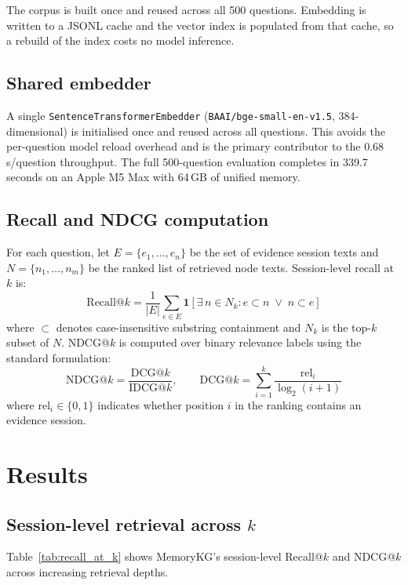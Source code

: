 \documentclass[11pt,a4paper]{article}
\begin{document}
The corpus is built once and reused across all 500 questions.
Embedding is written to a JSONL cache and the vector index is populated from
that cache, so a rebuild of the index costs no model inference.

\subsection{Shared embedder}

A single \texttt{SentenceTransformerEmbedder}
(\texttt{BAAI/bge-small-en-v1.5}, 384-dimensional)
is initialised once and reused across all questions.
This avoids the per-question model reload overhead and is the primary contributor
to the 0.68 s/question throughput.
The full 500-question evaluation completes in 339.7 seconds on an Apple M5 Max
with 64\,GB of unified memory.

\subsection{Recall and NDCG computation}

For each question, let $E = \{e_1, \ldots, e_n\}$ be the set of evidence session texts and
$N = \{n_1, \ldots, n_m\}$ be the ranked list of retrieved node texts.
Session-level recall at $k$ is:
\[
  \text{Recall@}k = \frac{1}{|E|}
    \sum_{e \in E} \mathbf{1}\!\left[\exists\, n \in N_k :
      e \subset n \;\vee\; n \subset e
    \right]
\]
where $\subset$ denotes case-insensitive substring containment and $N_k$ is the
top-$k$ subset of $N$.
NDCG@$k$ is computed over binary relevance labels using the standard formulation:
\[
  \text{NDCG@}k = \frac{\text{DCG@}k}{\text{IDCG@}k}, \qquad
  \text{DCG@}k = \sum_{i=1}^{k} \frac{\text{rel}_i}{\log_2(i+1)}
\]
where $\text{rel}_i \in \{0,1\}$ indicates whether position $i$ in the ranking
contains an evidence session.

\section{Results}
\label{sec:results}

\subsection{Session-level retrieval across $k$}

Table~\ref{tab:recall_at_k} shows MemoryKG's session-level Recall@$k$ and NDCG@$k$
across increasing retrieval depths.
\end{document}
